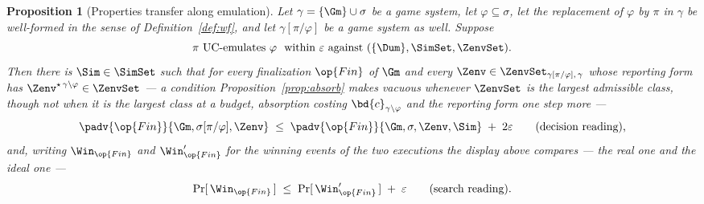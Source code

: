 \documentclass[10pt,oneside,openany]{book}
\theoremstyle{accentdef}
\theoremstyle{accentplain}
\newtheorem{proposition}[definition]{Proposition}
\begin{document}
\begin{proposition}[Properties transfer along emulation]\label{prop:proptransfer}
Let $\gamma = \{\Gm\} \cup \sigma$ be a game system, let $\varphi \subseteq \sigma$, let the
replacement of $\varphi$ by $\pi$ in $\gamma$ be well-formed in the sense of Definition~\ref{def:wf},
and let $\gamma[\pi/\varphi]$ be a game system as well. Suppose
\[
  \pi \ \text{UC-emulates} \ \varphi \ \text{ within } \varepsilon \text{ against }
  (\{\Dum\},\SimSet,\ZenvSet) .
\]
Then there is $\Sim \in \SimSet$ such that for every finalization $\op{Fin}$ of $\Gm$ and every
$\Zenv \in \ZenvSet_{\gamma[\pi/\varphi],\,\gamma}$
whose reporting form has $\Zenv^{\star\,\gamma \setminus \varphi} \in \ZenvSet$ --- a condition
Proposition~\ref{prop:absorb} makes vacuous whenever $\ZenvSet$ is the largest admissible class, though
not when it is the largest class at a \emph{budget}, absorption costing
$\bd{c}_{\gamma \setminus \varphi}$ and the reporting form one step more ---
\[
  \padv{\op{Fin}}{\Gm,\sigma[\pi/\varphi],\Zenv}
  \;\leq\;
  \padv{\op{Fin}}{\Gm,\sigma,\Zenv,\Sim} \;+\; 2\varepsilon
  \qquad \text{(decision reading),}
\]
and, writing $\Win_{\op{Fin}}$ and $\Win'_{\op{Fin}}$ for the winning events of the two executions
the display above compares --- the real one and the ideal one ---
\[
  \Pr[\,\Win_{\op{Fin}}\,] \;\leq\; \Pr[\,\Win'_{\op{Fin}}\,] \;+\; \varepsilon
  \qquad \text{(search reading).}
\]
\end{proposition}
\end{document}
